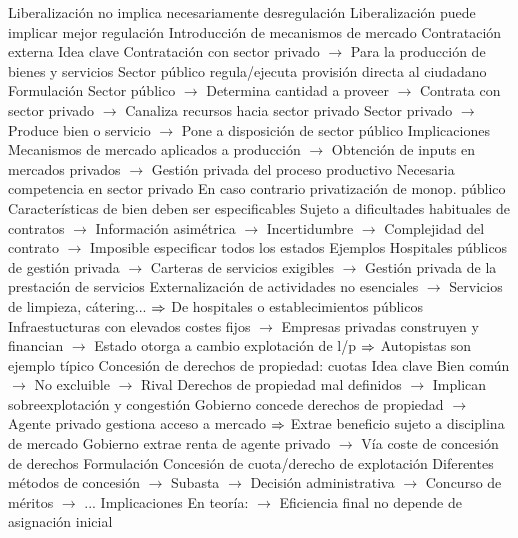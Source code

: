 \documentclass{nuevotema}
\begin{document}
\begin{esquemal}
				\4 Liberalización no implica necesariamente desregulación
				\4[] Liberalización puede implicar mejor regulación
		\2 Introducción de mecanismos de mercado
			\3 Contratación externa
				\4 Idea clave
				\4[] Contratación con sector privado
				\4[] $\to$ Para la producción de bienes y servicios
				\4[] Sector público regula/ejecuta provisión directa al ciudadano
				\4 Formulación
				\4[] Sector público
				\4[] $\to$ Determina cantidad a proveer
				\4[] $\to$ Contrata con sector privado
				\4[] $\to$ Canaliza recursos hacia sector privado
				\4[] Sector privado
				\4[] $\to$ Produce bien o servicio
				\4[] $\to$ Pone a disposición de sector público
				\4 Implicaciones
				\4[] Mecanismos de mercado aplicados a producción
				\4[] $\to$ Obtención de inputs en mercados privados
				\4[] $\to$ Gestión privada del proceso productivo
				\4[] Necesaria competencia en sector privado
				\4[] En caso contrario privatización de monop. público
				\4 Características de bien deben ser especificables
				\4[] Sujeto a dificultades habituales de contratos
				\4[] $\to$ Información asimétrica
				\4[] $\to$ Incertidumbre
				\4[] $\to$ Complejidad del contrato
				\4[] $\to$ Imposible especificar todos los estados
				\4 Ejemplos
				\4[] Hospitales públicos de gestión privada
				\4[] $\to$ Carteras de servicios exigibles
				\4[] $\to$ Gestión privada de la prestación de servicios
				\4[] Externalización de actividades no esenciales
				\4[] $\to$ Servicios de limpieza, cátering...
				\4[] $\Rightarrow$ De hospitales o establecimientos públicos
				\4[] Infraestucturas con elevados costes fijos
				\4[] $\to$ Empresas privadas construyen y financian
				\4[] $\to$ Estado otorga a cambio explotación de l/p
				\4[] $\Rightarrow$ Autopistas son ejemplo típico
			\3 Concesión de derechos de propiedad: cuotas
				\4 Idea clave
				\4[] Bien común
				\4[] $\to$ No excluible
				\4[] $\to$ Rival
				\4[] Derechos de propiedad mal definidos
				\4[] $\to$ Implican sobreexplotación y congestión
				\4[] Gobierno concede derechos de propiedad
				\4[] $\to$ Agente privado gestiona acceso a mercado
				\4[] $\Rightarrow$ Extrae beneficio sujeto a disciplina de mercado
				\4[] Gobierno extrae renta de agente privado
				\4[] $\to$ Vía coste de concesión de derechos
				\4 Formulación
				\4[] Concesión de cuota/derecho de explotación
				\4[] Diferentes métodos de concesión
				\4[] $\to$ Subasta
				\4[] $\to$ Decisión administrativa
				\4[] $\to$ Concurso de méritos
				\4[] $\to$ ...
				\4 Implicaciones
				\4[] En teoría:
				\4[] $\to$ Eficiencia final no depende de asignación inicial

\end{esquemal}
\end{document}
